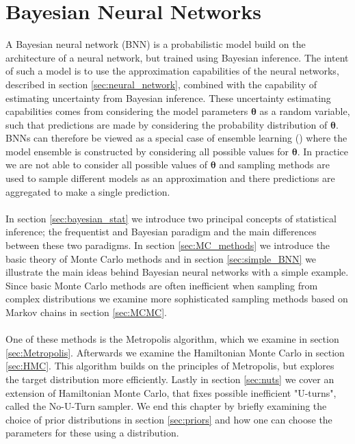 \chapter{Bayesian Neural Networks}
A Bayesian neural network (BNN) is a probabilistic model build on the architecture of a neural network, but trained using Bayesian inference. The intent of such a model is to use the approximation capabilities of the neural networks, described in section \ref{sec:neural_network}, combined with the capability of estimating uncertainty from Bayesian inference. These uncertainty estimating capabilities comes from considering the model parameters $\boldsymbol{\theta}$ as a random variable, such that predictions are made by considering the probability distribution of $\boldsymbol{\theta}$. BNNs can therefore be viewed as a special case of ensemble learning (\cite{zhou_ensemble}) where the model ensemble is constructed by considering all possible values for $\boldsymbol{\theta}$. In practice we are not able to consider all possible values of $\boldsymbol{\theta}$ and sampling methods are used to sample different models as an approximation and there predictions are aggregated to make a single prediction.\\
\\
In section \ref{sec:bayesian_stat} we introduce two principal concepts of statistical inference; the frequentist and Bayesian paradigm and the main differences between these two paradigms. In section \ref{sec:MC_methods} we introduce the basic theory of Monte Carlo methods and in section \ref{sec:simple_BNN} we illustrate the main ideas behind Bayesian neural networks with a simple example. Since basic Monte Carlo methods are often inefficient when sampling from complex distributions we examine more sophisticated sampling methods based on Markov chains in section \ref{sec:MCMC}.
\\
\\
One of these methods is the Metropolis algorithm, which we examine in section \ref{sec:Metropolis}. Afterwards we examine the Hamiltonian Monte Carlo in section \ref{sec:HMC}. This algorithm builds on the principles of Metropolis, but explores the target distribution more efficiently. Lastly in section \ref{sec:nuts} we cover an extension of Hamiltonian Monte Carlo, that fixes possible inefficient "U-turns", called the No-U-Turn sampler. We end this chapter by briefly examining the choice of prior distributions in section \ref{sec:priors} and how one can choose the parameters for these using a distribution.





